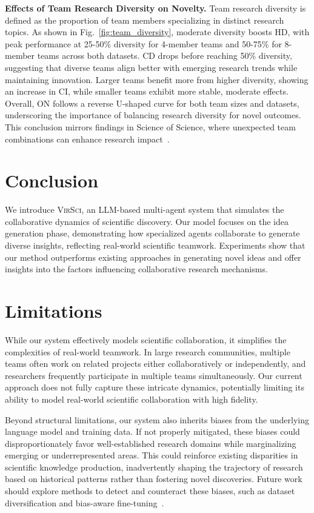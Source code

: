\documentclass[11pt]{article}
\def\modelname{\textsc{VirSci\xspace}}
\begin{document}
\noindent \textbf{Effects of Team Research Diversity on Novelty.} \label{sec:team_diversity} 
Team research diversity is defined as the proportion of team members specializing in distinct research topics. As shown in Fig.~\ref{fig:team_diversity}, moderate diversity boosts HD, with peak performance at 25-50\% diversity for 4-member teams and 50-75\% for 8-member teams across both datasets. CD drops before reaching 50\% diversity, suggesting that diverse teams align better with emerging research trends while maintaining innovation. Larger teams benefit more from higher diversity, showing an increase in CI, while smaller teams exhibit more stable, moderate effects. Overall, ON follows a reverse U-shaped curve for both team sizes and datasets, underscoring the importance of balancing research diversity for novel outcomes. This conclusion mirrors findings in Science of Science, where unexpected team combinations can enhance research impact~\citep{uzzi2013atypical, shi2023surprising}. 


\section{Conclusion}
We introduce \modelname, an LLM-based multi-agent system that simulates the collaborative dynamics of scientific discovery. Our model focuses on the idea generation phase, demonstrating how specialized agents collaborate to generate diverse insights, reflecting real-world scientific teamwork. Experiments show that our method outperforms existing approaches in generating novel ideas and offer insights into the factors influencing collaborative research mechanisms.

\section{Limitations}
While our system effectively models scientific collaboration, it simplifies the complexities of real-world teamwork. In large research communities, multiple teams often work on related projects either collaboratively or independently, and researchers frequently participate in multiple teams simultaneously. Our current approach does not fully capture these intricate dynamics, potentially limiting its ability to model real-world scientific collaboration with high fidelity.

Beyond structural limitations, our system also inherits biases from the underlying language model and training data. If not properly mitigated, these biases could disproportionately favor well-established research domains while marginalizing emerging or underrepresented areas. This could reinforce existing disparities in scientific knowledge production, inadvertently shaping the trajectory of research based on historical patterns rather than fostering novel discoveries. Future work should explore methods to detect and counteract these biases, such as dataset diversification and bias-aware fine-tuning~\cite{ansar2025bias}.
\end{document}
